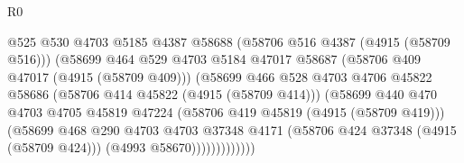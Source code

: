 \begin{lexlean}{R0}
\begin{coremodule}
                                                  @525
                                                  @530
                                                  @4703
                                                  @5185
                                                  @4387
                                                  @58688
                                                  (@58706 @516 @4387 (@4915 (@58709 @516)))
                                                  (@58699
                                                    @464
                                                    @529
                                                    @4703
                                                    @5184
                                                    @47017
                                                    @58687
                                                    (@58706 @409 @47017 (@4915 (@58709 @409)))
                                                    (@58699
                                                      @466
                                                      @528
                                                      @4703
                                                      @4706
                                                      @45822
                                                      @58686
                                                      (@58706 @414 @45822 (@4915 (@58709 @414)))
                                                      (@58699
                                                        @440
                                                        @470
                                                        @4703
                                                        @4705
                                                        @45819
                                                        @47224
                                                        (@58706 @419 @45819 (@4915 (@58709 @419)))
                                                        (@58699
                                                          @468
                                                          @290
                                                          @4703
                                                          @4703
                                                          @37348
                                                          @4171
                                                          (@58706 @424 @37348 (@4915 (@58709 @424)))
                                                          (@4993 @58670)))))))))))))

\end{coremodule}
\end{lexlean}
